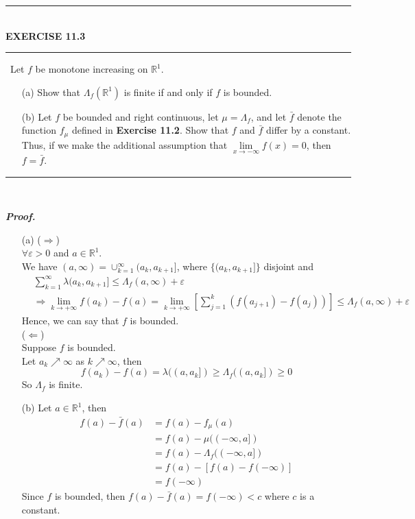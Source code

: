 \documentclass[a4paper,11pt]{article}
\begin{document}
	\begin{flushleft}
		\rule[-0.5ex]{17cm}{2pt}\\
			\textbf{EXERCISE 11.3}\\
		\rule[1.5ex]{17cm}{0.5pt}\
			Let $f$ be monotone increasing on $\mathbb{R}^1$.
			\begin{enumerate}
				\item[(a)] Show that $\Lambda_f (\mathbb{R}^1)$ is finite if and only if $f$ is bounded.\

				\item[(b)] Let $f$ be bounded and right continuous, let $\mu = \Lambda_f$, and let $\bar{f}$ denote the function $f_\mu$ defined in \textbf{Exercise 11.2}. Show that $f$ and $\bar{f}$ differ by a constant.\\
				Thus, if we make the additional assumption that $\underset{x \to -\infty}{\lim} f(x) = 0$, then $f = \bar{f}$.
			\end{enumerate}
		\rule[1.0ex]{17cm}{0.5pt}\
	\end{flushleft}
	\textit{\textbf {Proof.}}
	\begin{enumerate}
		\item[(a)]
			($\Rightarrow$)\\
				$\forall \varepsilon > 0$ and $a \in \mathbb{R}^1$.\\
				We have $(a, \infty) = \cup_{k=1}^\infty (a_k,a_{k+1}]$, where $\{(a_k,a_{k+1}]\}$ disjoint and 
					$$\begin{aligned}
						&\sum_{k=1}^\infty \lambda(a_k,a_{k+1}]
						\leq \Lambda_f (a,\infty) + \varepsilon\\
						&\Rightarrow \underset{k \to +\infty}{\lim} f(a_k) - f(a)
						= \underset{k \to +\infty}{\lim} \left[ \sum_{j=1}^k (f(a_{j+1}) - f(a_j)) \right]
						\leq \Lambda_f (a,\infty) + \varepsilon
					\end{aligned}$$
				Hence, we can say that $f$ is bounded.\\

			($\Leftarrow$)\\
				Suppose $f$ is bounded.\\
				Let $a_k \nearrow \infty$ as $k \nearrow \infty$, then
					$$f(a_k) - f(a)
					= \lambda((a,a_k])
					\geq \Lambda_f((a,a_k])
					\geq 0$$
				So $\Lambda_f$ is finite.\\

		\item[(b)]
			Let $a \in \mathbb{R}^1$, then
				$$\begin{aligned}
					f(a) - \bar{f}(a)
					&= f(a) - f_\mu(a)\\
					&= f(a) - \mu((-\infty,a])\\
					&= f(a) - \Lambda_f((-\infty,a])\\
					&= f(a) - [f(a) - f(-\infty)]\\
					&= f(-\infty)
				\end{aligned}$$
			Since $f$ is bounded, then $f(a) - \bar{f}(a) = f(-\infty) < c$ where $c$ is a constant.\\
	\end{enumerate}
\end{document}
